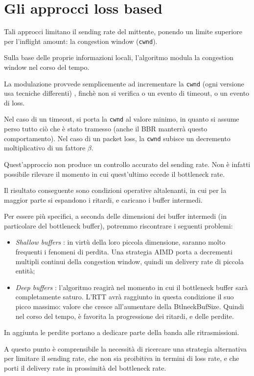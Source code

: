 \section{Gli approcci loss based}

Tali approcci limitano il sending rate del mittente, ponendo un limite superiore per l'inflight amount: la congestion window (\texttt{cwnd}). \bigskip

Sulla base delle proprie informazioni locali, l'algoritmo modula la congestion window nel corso del tempo. \bigskip

La modulazione provvede semplicemente ad incrementare la \texttt{cwnd} (ogni versione usa tecniche differenti) , finchè non si verifica o un evento di timeout, o un evento di loss. \bigskip

Nel caso di un timeout, si porta la \texttt{cwnd} al valore minimo, in quanto si assume perso tutto ciò che è stato tramesso (anche il BBR manterrà questo comportamento).
Nel caso di un packet loss, la \texttt{cwnd} subisce un decremento moltiplicativo di un fattore $ \beta $. \bigskip

Quest'approccio non produce un controllo accurato del sending rate. Non è infatti possibile rilevare il momento in cui quest'ultimo eccede il bottleneck rate. \bigskip

Il risultato conseguente sono condizioni operative altalenanti, in cui per la maggior parte si espandono i ritardi, e caricano i buffer intermedi. \bigskip

Per essere più specifici, a seconda delle dimensioni dei buffer intermedi (in particolare del bottleneck buffer), potremmo riscontrare i seguenti problemi:

\begin{itemize}

\item \textit{Shallow buffers} : in virtù della loro piccola dimensione, saranno molto frequenti i fenomeni di perdita. Una strategia AIMD porta a decrementi multipli continui della congestion window, quindi un delivery rate di piccola entità;

\item \textit{Deep buffers} : l'algoritmo reagirà nel momento in cui il bottleneck buffer sarà completamente saturo. L'RTT avrà raggiunto in questa condizione il suo picco massimo: valore che cresce all'aumentare della BtlneckBufSize. 
Quindi nel corso del tempo, è favorita la progressione dei ritardi, e delle perdite.

\end{itemize}

In aggiunta le perdite portano a dedicare parte della banda alle ritrasmissioni. \bigskip

A questo punto è comprensibile la necessità di ricercare una strategia alternativa per limitare il sending rate, che non sia proibitiva in termini di loss rate, e che porti il delivery rate in prossimità del bottleneck rate.